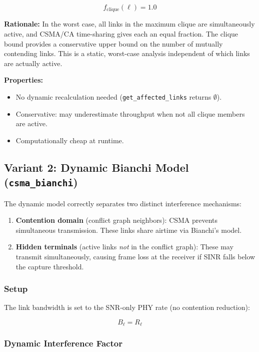 \documentclass[11pt,letterpaper]{article}
\begin{document}
\begin{equation}
f_\text{clique}(\ell) = 1.0
\end{equation}

\textbf{Rationale:} In the worst case, all links in the maximum clique are
simultaneously active, and CSMA/CA time-sharing gives each an equal fraction.
The clique bound provides a conservative upper bound on the number of mutually
contending links.  This is a static, worst-case analysis independent of which
links are actually active.

\textbf{Properties:}
\begin{itemize}[itemsep=2pt]
\item No dynamic recalculation needed (\texttt{get\_affected\_links} returns $\emptyset$).
\item Conservative: may underestimate throughput when not all clique members are active.
\item Computationally cheap at runtime.
\end{itemize}

\subsection{Variant 2: Dynamic Bianchi Model (\texttt{csma\_bianchi})}
\label{sec:bianchi_model}

The dynamic model correctly separates two distinct interference mechanisms:

\begin{enumerate}
\item \textbf{Contention domain} (conflict graph neighbors): CSMA prevents
  simultaneous transmission.  These links share airtime via Bianchi's model.
\item \textbf{Hidden terminals} (active links \emph{not} in the conflict graph):
  These may transmit simultaneously, causing frame loss at the receiver
  if SINR falls below the capture threshold.
\end{enumerate}

\subsubsection{Setup}

The link bandwidth is set to the SNR-only PHY rate (no contention reduction):

\begin{equation}
B_\ell = R_\ell
\end{equation}

\subsubsection{Dynamic Interference Factor}
\end{document}
